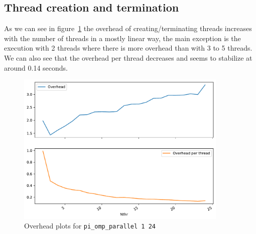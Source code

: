 


\pagebreak
\null\vfill 

\subsection{Thread creation and termination}
As we can see in figure~\ref{fig:parallel} the overhead of creating/terminating threads increases with the number of threads in a mostly linear way, the main exception is the execution with 2 threads where there is more overhead than
with  3 to 5 threads. We can also see that the overhead per thread decreases and seems to stabilize at around 0.14 seconds.

\vspace{5em}

\begin{figure}[H]
    \centering
    \caption{Overhead plots for \texttt{pi\_omp\_parallel 1 24}}%
    \label{fig:parallel}
    \includegraphics[width=0.9\textwidth]{data/parallel_sub.pdf}
\end{figure}
\null\vfill

